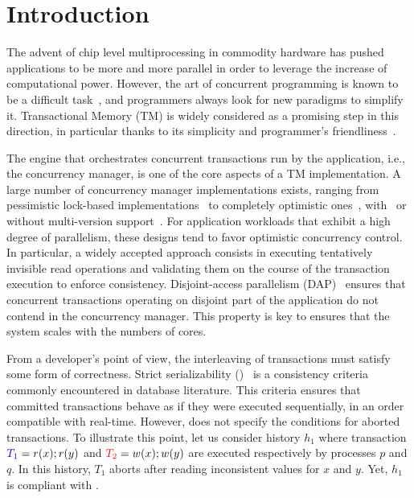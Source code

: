 \section{Introduction}

The advent of chip level multiprocessing in commodity hardware has pushed applications to be more and more parallel in order to leverage the increase of computational power.
However, the art of concurrent programming is known to be a difficult task~\cite{Lee:2006:PT:1137232.1137289}, and programmers always look for new paradigms to simplify it.
Transactional Memory (TM) is widely considered as a promising step in this direction, in particular thanks to its simplicity and programmer's friendliness~\cite{Dragojevic:2011:WSM:1924421.1924440}.

The engine that orchestrates concurrent transactions run by the application, i.e., the concurrency manager, is one of the core aspects of a TM implementation.
A large number of concurrency manager implementations exists, ranging from pessimistic lock-based implementations~\cite{harris2005revocable,afek2012pessimistic} to completely optimistic ones~\cite{hassan2014optimistic}, with~\cite{perelman2011smv} or without multi-version support~\cite{attiya2012single}.
For application workloads that exhibit a high degree of parallelism, these designs tend to favor optimistic concurrency control.
In particular, a widely accepted approach consists in executing tentatively invisible read operations and validating them on the course of the transaction execution to enforce consistency.
Disjoint-access parallelism (DAP)~\cite{ellen2012universal} ensures that concurrent transactions operating on disjoint part of the application do not contend in the concurrency manager.
This property is key to ensures that the system scales with the numbers of cores.

From a developer's point of view, the interleaving of transactions must satisfy some form of correctness.
Strict serializability (\SSER)~\cite{herlihy1990linearizability} is a consistency criteria commonly encountered in database literature.
This criteria ensures that committed transactions behave as if they were executed sequentially, in an order compatible with real-time.
However, \SSER does not specify the conditions for aborted transactions.
To illustrate this point, let us consider history $h_1$ where transaction ${\color{blue}{T_1}}=r(x);r(y)$ and ${\color{red}{T_2}}=w(x);w(y)$ are executed respectively by processes $p$ and $q$.
In this history, $T_1$ aborts after reading inconsistent values for $x$ and $y$.
Yet, $h_1$ is compliant with \SSER.


